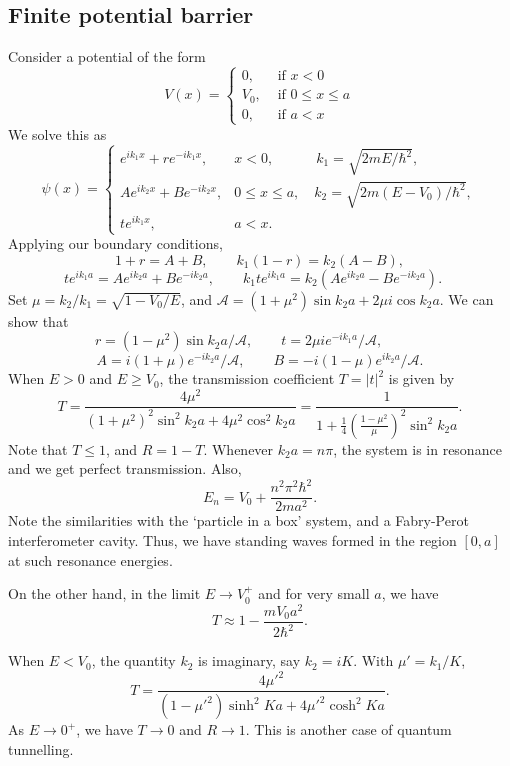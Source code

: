 \documentclass[11pt]{article}
\theoremstyle{definition}
\theoremstyle{remark}
\numberwithin{equation}{section}
\begin{document}
    \subsection{Finite potential barrier}
    Consider a potential of the form \[
        V(x) = \begin{cases}
            0, &\text{ if }x < 0 \\
            V_0, &\text{ if } 0 \leq x \leq a \\
            0, &\text{ if } a < x
        \end{cases}
    \] We solve this as \[
        \psi(x) = \begin{cases}
            e^{ik_1x} + re^{-ik_1x}, & x < 0, \quad\qquad\! k_1 = \sqrt{2mE /
            \hbar^2}, \\
            Ae^{ik_2x} + Be^{-ik_2x}, & 0 \leq x \leq a, \quad k_2 = \sqrt{2m(E -
            V_0) / \hbar^2}, \\
            te^{ik_1x}, & a < x.
        \end{cases}
    \] Applying our boundary conditions, \[
        1 + r = A + B, \qquad k_1(1 - r) = k_2(A - B),
    \] \[
        te^{ik_1a} = Ae^{ik_2a} + Be^{-ik_2a}, \qquad 
        k_1te^{ik_1a} = k_2(Ae^{ik_2a} - Be^{-ik_2a}). \quad
    \] Set $\mu = k_2 /k_1 = \sqrt{1 - V_0 /E}$, and $\mathscr{A} = (1 +
    \mu^2)\sin{k_2a} + 2\mu i\cos{k_2 a}$. We can show that \[
        r = (1 - \mu^2)\sin{k_2a} / \mathscr{A}, \qquad 
        t = 2\mu ie^{-ik_1a} / \mathscr{A}, \qquad\quad
    \] \[
        A = i(1 + \mu)e^{-ik_2a} / \mathscr{A}, \qquad 
        B = -i(1 - \mu)e^{ik_2a} / \mathscr{A}.
    \] When $E > 0$ and $E \geq V_0$, the transmission coefficient $T = |t|^2$ is
    given by \[
        T = \frac{4\mu^2}{(1 + \mu^2)^2\sin^2{k_2a} + 4\mu^2\cos^2{k_2a}} = 
        \frac{1}{1 + \frac{1}{4}\left(\frac{1 - \mu^2}{\mu}\right)^2 \sin^2{k_2a}}.
    \] Note that $T \leq 1$, and $R = 1 - T$. Whenever $k_2a = n\pi$, the system is
    in resonance and we get perfect transmission. Also, \[
        E_n = V_0 + \frac{n^2\pi^2\hbar^2}{2ma^2}.
    \] Note the similarities with the `particle in a box' system, and a Fabry-Perot
    interferometer cavity. Thus, we have standing waves formed in the region $[0,
    a]$ at such resonance energies.

    On the other hand, in the limit $E \to V_0^+$ and for very small $a$, we have \[
        T \approx 1 - \frac{mV_0a^2}{2\hbar^2}.
    \] 

    When $E < V_0$, the quantity $k_2$ is imaginary, say $k_2 = iK$. With $\mu' =
    k_1 / K$, \[
        T = \frac{4\mu'^2}{(1 - \mu'^2)\sinh^2{Ka} + 4\mu'^2\cosh^2{Ka}}.
    \] As $E \to 0^+$, we have $T \to 0$ and $R \to 1$. This is another case of
    quantum tunnelling.
    
\end{document}

